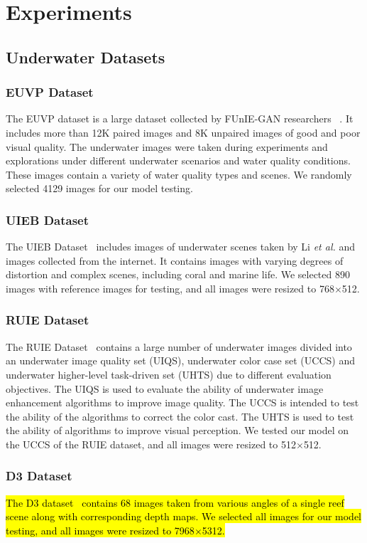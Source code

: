 \documentclass[utf8]{FrontiersinHarvard} %
\begin{document}
\section{Experiments}
\subsection{Underwater Datasets}
\subsubsection{EUVP Dataset}
The EUVP dataset is a large dataset collected by FUnIE-GAN researchers
~\citep{9001231}. It includes more than 12K paired images and 8K unpaired images of good and poor visual quality. The underwater images were taken during experiments and explorations under different underwater scenarios and water quality conditions. These images contain a variety of water quality types and scenes. We randomly selected 4129 images for our model testing.
\subsubsection{UIEB Dataset}
The UIEB Dataset~\citep{8917818} includes images of underwater scenes taken by Li \textit{et al.} and images collected from the internet. It contains images with varying degrees of distortion and complex scenes, including coral and marine life. We selected 890 images with reference images for testing, and all images were resized to 768$\times$512.
\subsubsection{RUIE Dataset}
The RUIE Dataset~\citep{8949763} contains a large number of underwater images divided into an underwater image quality set (UIQS), underwater color case set (UCCS) and underwater higher-level task-driven set (UHTS) due to different evaluation objectives. The UIQS is used to evaluate the ability of underwater image enhancement algorithms to improve image quality. The UCCS is intended to test the ability of the algorithms to correct the color cast. The UHTS is used to test the ability of algorithms to improve visual perception. We tested our model on the UCCS of the RUIE dataset, and all images were resized to 512$\times$512.

\subsubsection{D3 Dataset}
\hl{The D3 dataset~\citep{akkaynak2019sea} contains 68 images taken from various angles of a single reef scene along with corresponding depth maps. We selected all images for our model testing, and all images were resized to 7968$\times$5312.}
\end{document}
